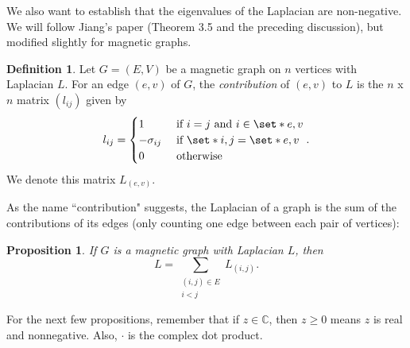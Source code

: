 \documentclass[12pt]{article}
\newtheorem{prop}[thm]{Proposition}
\theoremstyle{definition}
\newtheorem{defn}[thm]{Definition}
\newcommand{\C}{\mathbb C}
\begin{document}
We also want to establish that the eigenvalues of the Laplacian are non-negative. We will follow Jiang's paper (Theorem 3.5 and the preceding discussion), but modified slightly for magnetic graphs.

\begin{defn}
Let $G=(E,V)$ be a magnetic graph on $n$ vertices with Laplacian $L$. For an edge $(e, v)$ of $G$, the \textit{contribution} of $(e, v)$ to $L$ is the $n$ x $n$ matrix $(l_{ij})$ given by
$$
l_{ij} =
\begin{cases}
1 &\mbox{ if } i=j \mbox{ and } i \in \set*{e, v} \\
-\sigma_{ij} &\mbox{ if } \set*{i,j} = \set*{e,v} \\
0 &\mbox{ otherwise}
\end{cases}.
$$ 
We denote this matrix $L_{(e, v)}$.
\end{defn}

As the name ``contribution" suggests, the Laplacian of a graph is the sum of the contributions of its edges (only counting one edge between each pair of vertices):

\begin{prop}
If $G$ is a magnetic graph with Laplacian $L$, then 
$$
L = \sum_{\substack{(i, j) \in E \\ i < j}} L_{(i, j)}.
$$
\end{prop}

For the next few propositions, remember that if $z \in \C$, then $z \geq 0$ means $z$ is real and nonnegative. Also, $\cdot$ is the complex dot product.
\end{document}
